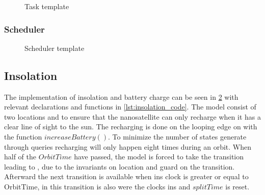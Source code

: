\begin{figure}[H]
	\caption{Task template}
	\label{fig:cora_inso}
\end{figure}
\subsubsection*{Scheduler}
\begin{figure}[H]
	\centering
	\caption{Scheduler template}
	\label{fig:cora_inso}
\end{figure}


\subsection*{Insolation}
The implementation of insolation and battery charge can be seen in \cref{fig:cora_inso} with relevant declarations and functions in \cref{lst:insolation_code}. The model consist of two locations  and  to ensure that the nanosatellite can only recharge when it has a clear line of sight to the sun. The recharging is done on the looping edge on  with the function $increaseBattery()$. To minimize the number of states generate through queries recharging will only happen eight times during an orbit. When half of the $OrbitTime$ have passed, the model is forced to take the transition leading to , due to the invariants on  location and guard on the transition. Afterward the next transition is available when ins clock is greater or equal to OrbitTime, in this transition is also were the clocks ins and $splitTime$ is reset.

